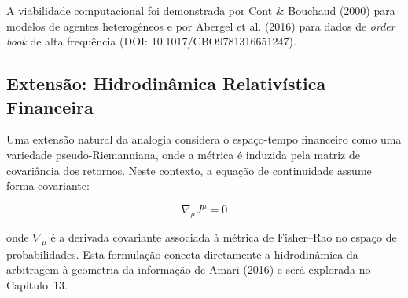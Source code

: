 A viabilidade computacional foi demonstrada por Cont \& Bouchaud (2000) para modelos de agentes heterog\^eneos e por Abergel et al. (2016) para dados de \textit{order book} de alta frequ\^encia (DOI: 10.1017/CBO9781316651247).

\subsection{Extens\~ao: Hidrodin\^amica Relativ\'istica Financeira}

Uma extens\~ao natural da analogia considera o espa\c{c}o-tempo financeiro como uma variedade pseudo-Riemanniana, onde a m\'etrica \'e induzida pela matriz de covari\^ancia dos retornos. Neste contexto, a equa\c{c}\~ao de continuidade assume forma covariante:

\begin{equation}\label{eq:continuidade-covariante}
\nabla_\mu J^\mu = 0
\end{equation}

onde $\nabla_\mu$ \'e a derivada covariante associada \`a m\'etrica de Fisher--Rao no espa\c{c}o de probabilidades. Esta formula\c{c}\~ao conecta diretamente a hidrodin\^amica da arbitragem \`a geometria da informa\c{c}\~ao de Amari (2016) e ser\'a explorada no Cap\'itulo~13.

